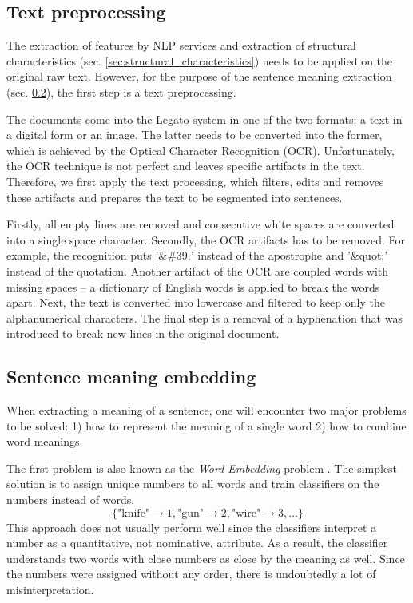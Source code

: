 \documentclass[
  digital, %
  notable,   %
  nolof,     %
  nolot,     %
]{fithesis3}
\begin{document}
\subsection{Text preprocessing}
The extraction of features by NLP services and extraction of structural characteristics (sec. \ref{sec:structural_characteristics}) needs to be applied on the original raw text.
However, for the purpose of the sentence meaning extraction (sec. \ref{sec:sentence-meaning}), the first step is a text preprocessing.

The documents come into the Legato system in one of the two formats: a text in a digital form or an image.
The latter needs to be converted into the former, which is achieved by the Optical Character Recognition (OCR).
Unfortunately, the OCR technique is not perfect and leaves specific artifacts in the text.
Therefore, we first apply the text processing, which filters, edits and removes these artifacts and prepares the text to be segmented into sentences.

Firstly, all empty lines are removed and consecutive white spaces are converted into a single space character.
Secondly, the OCR artifacts has to be removed.
For example, the recognition puts '\&\#39;' instead of the apostrophe and '\&quot;' instead of the quotation.
Another artifact of the OCR are coupled words with missing spaces -- a dictionary of English words is applied to break the words apart.
Next, the text is converted into lowercase and filtered to keep only the alphanumerical characters.
The final step is a removal of a hyphenation that was introduced to break new lines in the original document.

\subsection{Sentence meaning embedding}
\label{sec:sentence-meaning}
When extracting a meaning of a sentence, one will encounter two major problems to be solved: 1) how to represent the meaning of a single word 2) how to combine word meanings.

The first problem is also known as the \textit{Word Embedding} problem \cite{wordEmbeddings}.
The simplest solution is to assign unique numbers to all words and train classifiers on the numbers instead of words.
$$
\{\text{"knife"} \rightarrow 1, \text{"gun"} \rightarrow 2, \text{"wire"} \rightarrow 3, \dots\}
$$
This approach does not usually perform well since the classifiers interpret a number as a quantitative, not nominative,  attribute.
As a result, the classifier understands two words with close numbers as close by the meaning as well.
Since the numbers were assigned without any order, there is undoubtedly a lot of misinterpretation.
\end{document}
